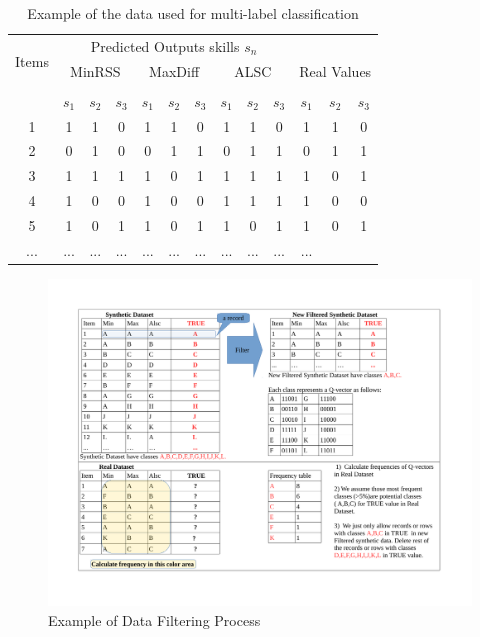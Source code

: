 \documentclass[12pt]{article}
\begin{document}
\begin{table}[h]
\centering
	\begin{tabular}{c|ccccccccc|ccc}	
\toprule
\multirow{3}{*}{Items} & \multicolumn{9}{c}{Predicted Outputs skills $s_n$}\\
\cmidrule{2-9}
& \multicolumn{3}{c}{ MinRSS } & \multicolumn{3}{c}{MaxDiff}&\multicolumn{3}{c|}{ALSC}& \multicolumn{3}{c}{Real Values} \\ \\
\cmidrule{2-9}
& $s_1$ & $s_2$ & $s_3$ & $s_1$ & $s_2$ & $s_3$ & $s_1$ & $s_2$ & $s_3$  & \textbf{$s_1$} & \textbf{$s_2$} & \textbf{$s_3$}\\ \hline

	1 & 1 & 1 & 0 & 1 & 1 & 0 & 1 & 1 & 0  & 1 & 1 & 0 \\
	2 & 0 & 1 & 0 & 0 & 1 & 1 & 0 & 1 & 1 & 0 & 1 & 1 \\
	3 & 1 & 1 & 1 & 1 & 0 & 1 &1 & 1 & 1 & 1 & 0 & 1\\
	4 & 1 & 0 & 0 & 1 & 0 & 0 & 1 & 1 & 1 & 1 & 0 & 0 \\
	5 & 1 & 0 & 1 & 1 & 0 & 1 & 1 & 0 & 1  & 1 & 0 & 1\\
	... &... &... &... &... &... &... &... &... &... &...\\
	 \hline\hline
       
	\end{tabular}

\caption{Example of the data used for multi-label classification} \label{ref:data} 
\end{table}
\begin{figure}[h]
  \centering
    \includegraphics[width=100 mm ,scale=0.5]{graph/DSP.pdf}
  \caption{Example of Data Filtering Process}\label{fig:DSP}
\end{figure} 
\end{document}
